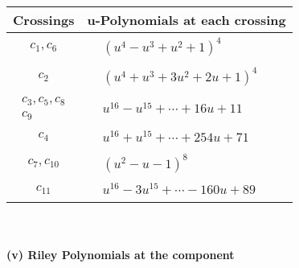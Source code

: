 \documentclass[1p]{elsarticle_modified}
\theoremstyle{definition}
\begin{document}
\begin{tabular}{m{50pt}|m{274pt}}
Crossings & \hspace{64pt}u-Polynomials at each crossing \\
\hline $$\begin{aligned}c_{1},c_{6}\end{aligned}$$&$\begin{aligned}
&(u^4- u^3+u^2+1)^4
\end{aligned}$\\
\hline $$\begin{aligned}c_{2}\end{aligned}$$&$\begin{aligned}
&(u^4+u^3+3 u^2+2 u+1)^4
\end{aligned}$\\
\hline $$\begin{aligned}c_{3},c_{5},c_{8}\\c_{9}\end{aligned}$$&$\begin{aligned}
&u^{16}- u^{15}+\cdots+16 u+11
\end{aligned}$\\
\hline $$\begin{aligned}c_{4}\end{aligned}$$&$\begin{aligned}
&u^{16}+u^{15}+\cdots+254 u+71
\end{aligned}$\\
\hline $$\begin{aligned}c_{7},c_{10}\end{aligned}$$&$\begin{aligned}
&(u^2- u-1)^8
\end{aligned}$\\
\hline $$\begin{aligned}c_{11}\end{aligned}$$&$\begin{aligned}
&u^{16}-3 u^{15}+\cdots-160 u+89
\end{aligned}$\\
\hline
\end{tabular}\\~\\
\newpage\renewcommand{\arraystretch}{1}
\flushleft \textbf{(v) Riley Polynomials at the component}\newline \\
\end{document}

